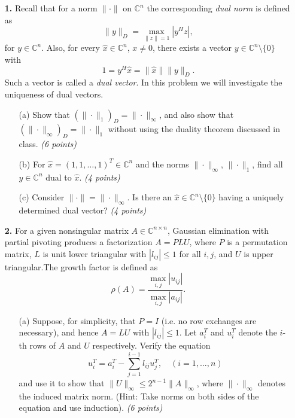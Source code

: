 \documentclass[10pt]{report}
\begin{document}
\begin{enumerate}
    
\item[\textbf{1.}] Recall that for a norm $\|\cdot\|$ on $\mathbb{C}^n$ the corresponding \textit{dual norm} is defined as \[\| y \|_D= \max_{\|z\|=1} |y^Hz|,\]
for $y \in \mathbb{C}^n$. Also, for every $\hat{x} \in \mathbb{C}^n$, $x \neq 0$, there exists a vector $y \in \mathbb{C}^n \setminus \{0\}$ with
\[1 = y^H \hat{x} = \|\hat{x}\|\|y\|_D.\] 
Such a vector is called a \textit{dual vector}. In this problem we will investigate the uniqueness of dual vectors.
  \begin{enumerate}
    \item[(a)] Show that $(\|\cdot\|_1)_D=\|\cdot\|_{\infty}$, and also show that
      $(\|\cdot\|_{\infty})_D=\|\cdot\|_{1}$ without using the duality theorem discussed in class. \textit{(6 points)}

  \item[(b)] For $\hat{x}= (1, 1, \ldots, 1)^T \in \mathbb{C}^{n}$ and the norms $\| \cdot \|_{\infty}$, $\| \cdot \|_{1}$, find all $y\in\mathbb{C}^{n}$ dual to $\hat{x}$. \textit{(4 points)}

    \item[(c)] Consider $\| \cdot \|= \|\cdot\|_{\infty}$. Is there an $\hat{x}\in\mathbb{C}^{n}\setminus\{0\}$ having a uniquely determined dual vector? \textit{(4 points)}
  \end{enumerate}

\vspace{0.1cm} 

\item[\textbf{2.}] For a given nonsingular matrix $A\in\mathbb{C}^{n\times n}$, Gaussian elimination with partial pivoting produces a factorization $A=PLU$, where $P$ is a permutation matrix, $L$ is unit lower triangular with $|l_{ij}|\leq1$ for all $i,j$, and $U$ is upper triangular.The growth factor is defined as\[\rho(A)=\frac{\max_{i,j}|u_{ij}|}{\max_{i,j}|a_{ij}|}.\]

  \begin{enumerate}

\item[(a)] Suppose, for simplicity, that $P=I$ (i.e. no row exchanges are necessary), and hence $A=LU$ with $|l_{ij}| \leq 1$. Let $a_i^T$ and $u_i^T$ denote the $i$-th rows of $A$ and $U$ respectively. Verify the equation
\[u_i^{T}=a_i^T-\sum_{j=1}^{i-1}l_{ij}u_j^T, \,\,\,\,\,\,(i= 1, \ldots, n)\] 
and use it to show that $\|U\|_{\infty} \leq 2^{n-1}\|A\|_{\infty}$, where $\|\cdot\|_{\infty}$ denotes the induced matrix norm. (Hint: Take norms on both sides of the equation and use induction). \textit{(6 points)}


\end{enumerate}
\end{enumerate}
\end{document}
